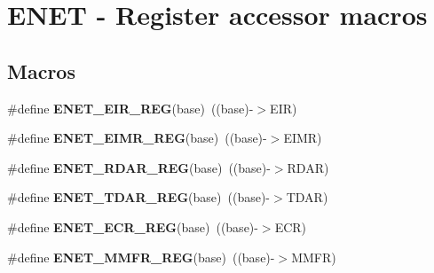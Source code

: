 \hypertarget{group__ENET__Register__Accessor__Macros}{}\section{E\+N\+ET -\/ Register accessor macros}
\label{group__ENET__Register__Accessor__Macros}
\subsection*{Macros}
\begin{DoxyCompactItemize}
\item 
\#define {\bfseries E\+N\+E\+T\+\_\+\+E\+I\+R\+\_\+\+R\+EG}(base)~((base)-\/$>$E\+IR)\hypertarget{group__ENET__Register__Accessor__Macros_ga243cecd316931620fdccc271b7f13b15}{}\label{group__ENET__Register__Accessor__Macros_ga243cecd316931620fdccc271b7f13b15}

\item 
\#define {\bfseries E\+N\+E\+T\+\_\+\+E\+I\+M\+R\+\_\+\+R\+EG}(base)~((base)-\/$>$E\+I\+MR)\hypertarget{group__ENET__Register__Accessor__Macros_gae0534a7b50fcd87adde8eba2a9714aab}{}\label{group__ENET__Register__Accessor__Macros_gae0534a7b50fcd87adde8eba2a9714aab}

\item 
\#define {\bfseries E\+N\+E\+T\+\_\+\+R\+D\+A\+R\+\_\+\+R\+EG}(base)~((base)-\/$>$R\+D\+AR)\hypertarget{group__ENET__Register__Accessor__Macros_ga7bf96480211895e577d7878d02147266}{}\label{group__ENET__Register__Accessor__Macros_ga7bf96480211895e577d7878d02147266}

\item 
\#define {\bfseries E\+N\+E\+T\+\_\+\+T\+D\+A\+R\+\_\+\+R\+EG}(base)~((base)-\/$>$T\+D\+AR)\hypertarget{group__ENET__Register__Accessor__Macros_ga638e1493b995e05f3729264a0136675e}{}\label{group__ENET__Register__Accessor__Macros_ga638e1493b995e05f3729264a0136675e}

\item 
\#define {\bfseries E\+N\+E\+T\+\_\+\+E\+C\+R\+\_\+\+R\+EG}(base)~((base)-\/$>$E\+CR)\hypertarget{group__ENET__Register__Accessor__Macros_ga660a93abbcd768a20dcac4b37880b030}{}\label{group__ENET__Register__Accessor__Macros_ga660a93abbcd768a20dcac4b37880b030}

\item 
\#define {\bfseries E\+N\+E\+T\+\_\+\+M\+M\+F\+R\+\_\+\+R\+EG}(base)~((base)-\/$>$M\+M\+FR)\hypertarget{group__ENET__Register__Accessor__Macros_ga34b0cc224af06adec2766a92c8509f5c}{}\label{group__ENET__Register__Accessor__Macros_ga34b0cc224af06adec2766a92c8509f5c}


\end{DoxyCompactItemize}
